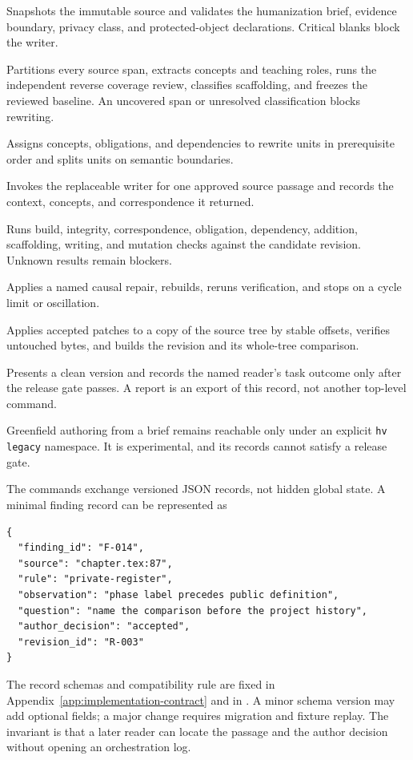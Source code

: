 \begin{description}[style=nextline,leftmargin=30mm,labelindent=0mm]
\item[\texttt{hv init}] Snapshots the immutable source and validates the
humanization brief, evidence boundary, privacy class, and protected-object
declarations. Critical blanks block the writer.
\item[\texttt{hv inventory}] Partitions every source span, extracts concepts and
teaching roles, runs the independent reverse coverage review, classifies
scaffolding, and freezes the reviewed baseline. An uncovered span or unresolved
classification blocks rewriting.
\item[\texttt{hv plan}] Assigns concepts, obligations, and dependencies to
rewrite units in prerequisite order and splits units on semantic boundaries.
\item[\texttt{hv rewrite}] Invokes the replaceable writer for one approved source
passage and records the context, concepts, and correspondence it returned.
\item[\texttt{hv preflight}] Runs build, integrity, correspondence, obligation,
dependency, addition, scaffolding, writing, and mutation checks against the
candidate revision. Unknown results remain blockers.
\item[\texttt{hv repair}] Applies a named causal repair, rebuilds, reruns
verification, and stops on a cycle limit or oscillation.
\item[\texttt{hv assemble}] Applies accepted patches to a copy of the source tree
by stable offsets, verifies untouched bytes, and builds the revision and its
whole-tree comparison.
\item[\texttt{hv release}] Presents a clean version and records the named
reader's task outcome only after the release gate passes. A report is an export
of this record, not another top-level command.
\end{description}

Greenfield authoring from a brief remains reachable only under an explicit
\texttt{hv legacy} namespace. It is experimental, and its records cannot satisfy
a release gate.

The commands exchange versioned JSON records, not hidden global state. A
minimal finding record can be represented as
\begin{verbatim}
{
  "finding_id": "F-014",
  "source": "chapter.tex:87",
  "rule": "private-register",
  "observation": "phase label precedes public definition",
  "question": "name the comparison before the project history",
  "author_decision": "accepted",
  "revision_id": "R-003"
}
\end{verbatim}
The record schemas and compatibility rule are fixed in Appendix~\ref{app:implementation-contract}
and in . A minor schema version may add optional fields; a major
change requires migration and fixture replay. The invariant is that a later
reader can locate the passage and the author decision without opening an
orchestration log.

